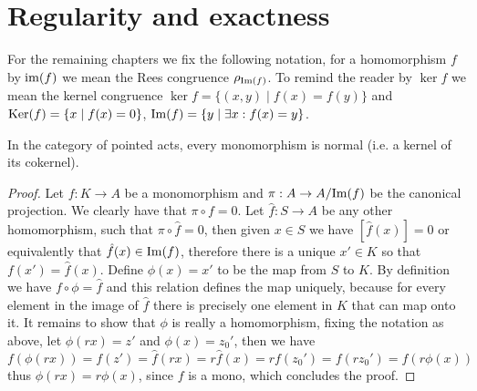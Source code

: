 \section{Regularity and exactness}
    For the remaining chapters we fix the following notation, for a homomorphism $f$ by $\text{im}(f)$ we mean the 
    Rees congruence $\rho_{\mathrm{Im}(f)}$. To remind the reader by $\ker{f}$ we mean the kernel congruence $\ker{f} = \{(x,y) \mid f(x)=f(y)\}$
    and $\mathrm{Ker}(f) = \{x \mid f(x) = 0\}$, $\mathrm{Im}(f) = \{ y \mid \exists x : f(x) =y \}$.
\begin{proposition}
    In the category of pointed acts, every monomorphism is normal (i.e. a kernel of its cokernel). 
\end{proposition}
\begin{proof}[Proof]
    Let $f: K \to A$ be a monomorphism and $\pi : A \to A/\mathrm{Im}(f)$ be the canonical projection. We clearly have that 
    $\pi\circ f = 0$. Let $\hat{f} : S \to A$ be any other homomorphism, such that $\pi\circ\hat{f} = 0$, then 
    given $x\in S$ we have $[\hat{f}(x)]=0$ or equivalently that $\hat{f}(x)\in\mathrm{Im}(f)$, therefore there is a unique 
    $x'\in K$ so that $f(x')=\hat{f}(x)$. Define $\phi(x)=x'$ to be the map from $S$ to $K$. By definition we have 
    $f\circ\phi = \hat{f}$ and this relation defines the map uniquely, because for every element in the image of $\hat{f}$ there 
    is precisely one element in $K$ that can map onto it. It remains to show that $\phi$ is really a homomorphism, fixing the 
    notation as above, let $\phi(rx)=z'$ and $\phi(x)=z_0'$, then we have 
    \[
        f(\phi(rx))=f(z')=\hat{f}(rx)=r\hat{f}(x)=rf(z_0')=f(rz_0')=f(r\phi(x))
    \]
    thus $\phi(rx)=r\phi(x)$, since $f$ is a mono, which concludes the proof.
\end{proof}

